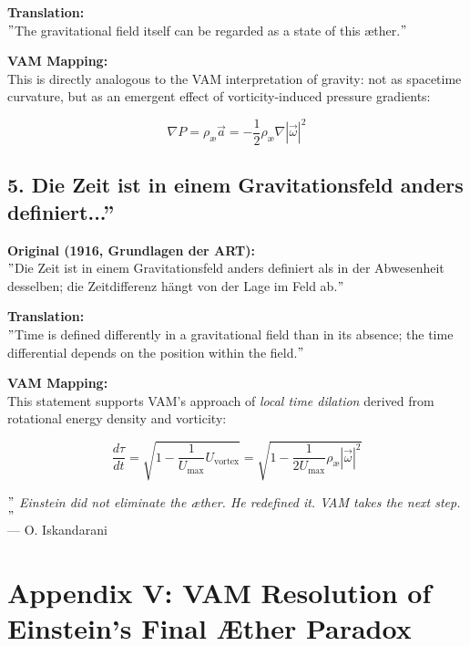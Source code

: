 \documentclass[preprint]{revtex4-2}
\begin{document}
    \textbf{Translation:} \\
    \("\)The gravitational field itself can be regarded as a state of this æther.\("\)

    \textbf{VAM Mapping:} \\
    This is directly analogous to the VAM interpretation of gravity: not as spacetime curvature, but as an emergent effect of vorticity-induced pressure gradients:

    \[
    \nabla P = \rho_\text{\ae} \vec{a} = -\frac{1}{2} \rho_\text{\ae} \nabla |\vec{\omega}|^2
    \]

    \subsection*{5. \grqq Die Zeit ist in einem Gravitationsfeld anders definiert...\textquotedblright}
    \textbf{Original (1916, Grundlagen der ART):} \\
    \("\)Die Zeit ist in einem Gravitationsfeld anders definiert als in der Abwesenheit desselben; die Zeitdifferenz hängt von der Lage im Feld ab.\("\)

    \textbf{Translation:} \\
    \("\)Time is defined differently in a gravitational field than in its absence; the time differential depends on the position within the field.\("\)

    \textbf{VAM Mapping:} \\
    This statement supports VAM's approach of \emph{local time dilation} derived from rotational energy density and vorticity:

    \[
    \frac{d\tau}{dt} = \sqrt{1 - \frac{1}{U_\text{max}} U_{\text{vortex}}} = \sqrt{1 - \frac{1}{2U_\text{max}} \rho_\text{\ae} |\vec{\omega}|^2}
    \]

    \bigskip
    \textit{ \("\) Einstein did not eliminate the æther. He redefined it. VAM takes the next step. \("\)}\\
    \hfill — O. Iskandarani\\

\section*{Appendix V: VAM Resolution of Einstein’s Final Æther Paradox}
\label{appendix:final-aether}

    \vspace{-0.5em}
\end{document}
